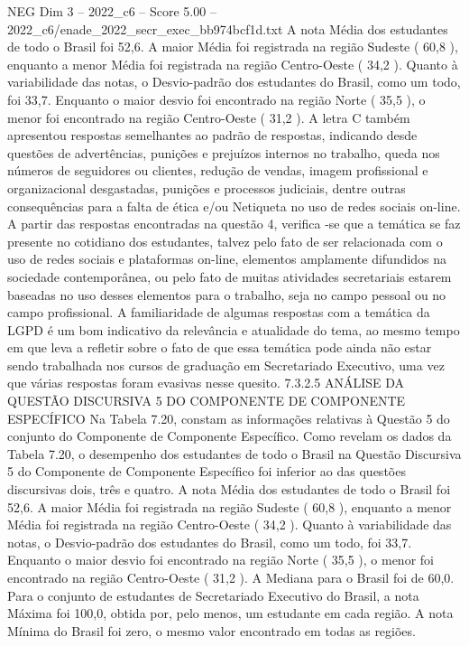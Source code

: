 \begin{textsample}{NEG Dim 3 – 2022\_c6 – Score 5.00 – 2022\_c6/enade\_2022\_secr\_exec\_bb974bcf1d.txt}
A nota Média dos estudantes de todo o Brasil foi 52,6.
A maior Média foi registrada na região Sudeste ( 60,8 ), enquanto a menor Média foi registrada na região Centro-Oeste ( 34,2 ).
Quanto à variabilidade das notas, o Desvio-padrão dos estudantes do Brasil, como um todo, foi 33,7.
Enquanto o maior desvio foi encontrado na região Norte ( 35,5 ), o menor foi encontrado na região Centro-Oeste ( 31,2 ).
A letra C também apresentou respostas semelhantes ao padrão de respostas, indicando desde questões de advertências, punições e prejuízos internos no trabalho, queda nos números de seguidores ou clientes, redução de vendas, imagem profissional e organizacional desgastadas, punições e processos judiciais, dentre outras consequências para a falta de ética e/ou Netiqueta no uso de redes sociais on-line.
A partir das respostas encontradas na questão 4, verifica -se que a temática se faz presente no cotidiano dos estudantes, talvez pelo fato de ser relacionada com o uso de redes sociais e plataformas on-line, elementos amplamente difundidos na sociedade contemporânea, ou pelo fato de muitas atividades secretariais estarem baseadas no uso desses elementos para o trabalho, seja no campo pessoal ou no campo profissional.
A familiaridade de algumas respostas com a temática da LGPD é um bom indicativo da relevância e atualidade do tema, ao mesmo tempo em que leva a refletir sobre o fato de que essa temática pode ainda não estar sendo trabalhada nos cursos de graduação em Secretariado Executivo, uma vez que várias respostas foram evasivas nesse quesito. 7.3.2.5 ANÁLISE DA QUESTÃO DISCURSIVA 5 DO COMPONENTE DE COMPONENTE ESPECÍFICO Na Tabela 7.20, constam as informações relativas à Questão 5 do conjunto do Componente de Componente Específico.
Como revelam os dados da Tabela 7.20, o desempenho dos estudantes de todo o Brasil na Questão Discursiva 5 do Componente de Componente Específico foi inferior ao das questões discursivas dois, três e quatro.
A nota Média dos estudantes de todo o Brasil foi 52,6.
A maior Média foi registrada na região Sudeste ( 60,8 ), enquanto a menor Média foi registrada na região Centro-Oeste ( 34,2 ).
Quanto à variabilidade das notas, o Desvio-padrão dos estudantes do Brasil, como um todo, foi 33,7.
Enquanto o maior desvio foi encontrado na região Norte ( 35,5 ), o menor foi encontrado na região Centro-Oeste ( 31,2 ).
A Mediana para o Brasil foi de 60,0.
Para o conjunto de estudantes de Secretariado Executivo do Brasil, a nota Máxima foi 100,0, obtida por, pelo menos, um estudante em cada região.
A nota Mínima do Brasil foi zero, o mesmo valor encontrado em todas as regiões.

\end{textsample}
